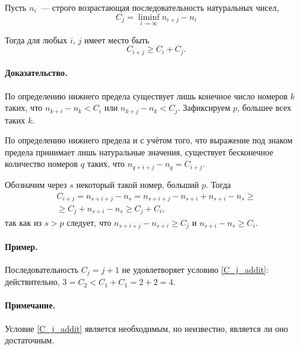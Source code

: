 \documentclass[a5paper,12pt,openbib]{report}
\begin{document}

Пусть $n_i$~--- строго возрастающая последовательность натуральных чисел,
\begin{equation}
	C_j = \liminf_{i\to\infty} n_{i+j} - n_i
\end{equation}

Тогда для любых $i$, $j$ имеет место быть
\begin{equation}\label{C_j_addit}
	C_{i+j} \geq C_i + C_j
	.
\end{equation}
\paragraph{Доказательство.}
По определению нижнего предела существует лишь конечное число номеров $k$
таких, что $n_{k+i} - n_k < C_i$ или $n_{k+j} - n_k < C_j$.
Зафиксируем $p$, большее всех таких $k$.

По определению нижнего предела и с учётом того, что выражение под знаком предела
принимает лишь натуральные значения,
существует бесконечное количество номеров $q$ таких, что $n_{q+i+j} - n_q = C_{i+j}$.

Обозначим через $s$ некоторый такой номер, больший $p$.
Тогда
\begin{multline}
	C_{i+j} = n_{s+i+j} - n_s = n_{s+i+j} - n_{s+i} + n_{s+i} - n_s
	\geq \\
	\geq C_j + n_{s+i} - n_s \geq C_j + C_i,
\end{multline}
так как из $s>p$ следует, что $n_{s+i+j} - n_{s+i} \geq C_j$ и $n_{s+i} - n_s \geq C_i$.

\paragraph{Пример.}
Последовательность $C_j = j+1$ не удовлетворяет условию \eqref{C_j_addit}:
действительно, $3=C_2 < C_1+C_1 = 2+2 = 4$.

\paragraph{Примечание.}
Условие \eqref{C_j_addit} является необходимым, но неизвестно, является ли оно достаточным.
\end{document}
